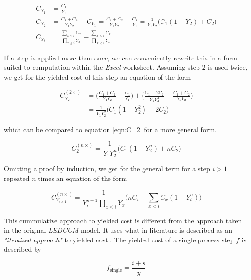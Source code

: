 \documentclass[10pt]{article}
\begin{document}
\begin{equation}
\begin{split}
\label{eqn:C_2}
    C_{Y_1} &= \frac{C_1}{Y_1} \\
    C_{Y_2} &= \frac{C_1 + C_2}{Y_1 Y_2} - C_{Y_1} = \frac{C_1 + C_2}{Y_1 Y_2} - \frac{C_1}{Y_1} = \frac{1}{Y_1 Y_2} \bigg ( C_1 (1-Y_2) +C_2 \bigg)\\
    C_{Y_i} &= \frac{ \sum_{x \leq i} C_x }{ \prod_{x \leq i} Y_x } - \frac{ \sum_{x<i} C_x }{ \prod_{x<i} Y_x }
\end{split}
\end{equation}

If a step is applied more than once, we can conveniently rewrite this in a form suited to computation within the \textit{Excel} worksheet. Assuming step $2$ is used twice, we get for the yielded cost of this step an equation of the form

\begin{align}
\label{eqn:C_2^2}
    C_{Y_2}^{(2 \times)} &= \bigg( \frac{C_1 + C_2}{Y_1 Y_2} - \frac{C_1}{Y_1} \bigg) + \bigg( \frac{C_1 + 2 C_2}{Y_1 Y_2^2} - \frac{C_1 + C_2}{Y_1 Y_2}     \bigg) \\
    &= \frac{1}{Y_1 Y_2^2} \bigg( C_1 (1-Y_2^2) +2C_2 \bigg)
\end{align}

which can be compared to equation \ref{eqn:C_2} for a more general form.

\begin{equation}
    C_2^{(n \times)} = \frac{1}{Y_1 Y_2^n} \bigg( C_1 (1-Y_2^n)+nC_2\bigg)
\end{equation}

Omitting a proof by induction, we get for the general term for a step $i>1$ repeated $n$ times an equation of the form

\begin{equation}
\label{eqn:yielded_cost}
    C_{Y_{i>1}}^{(n \times)} = \frac{1}{Y_i^{n-1} \prod_{x \leq i} Y_x} \bigg( nC_i + \sum_{x < i} C_x (1-Y_i^n) \bigg)
\end{equation}

This cummulative approach to yielded cost is different from the approach taken in the original \textit{LEDCOM} model. It uses what in literature is described as an \textit{"itemized approach"} to yielded cost \cite{becker2001use}. The yielded cost of a single process step $f$ is described by

\begin{equation}
	f_\text{single} = \frac{i+s}{y}
\end{equation}
\end{document}
